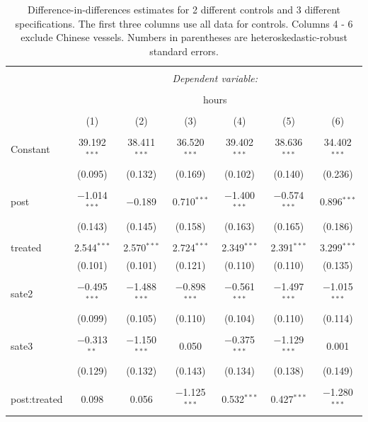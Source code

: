 \documentclass[11pt,english]{article}
\begin{document}
\begin{table}[!htbp] \centering 
  \caption{\label{tab:long}Difference-in-differences estimates for 2 different controls and 3 different specifications. The first three columns use all data for controls. Columns 4 - 6 exclude Chinese vessels. Numbers in parentheses are heteroskedastic-robust standard errors.} 
  \label{} 
\small 
\begin{tabular}{@{\extracolsep{1pt}}lcccccc} 
\\[-1.8ex]\hline 
\hline \\[-1.8ex] 
 & \multicolumn{6}{c}{\textit{Dependent variable:}} \\ 
\cline{2-7} 
\\[-1.8ex] & \multicolumn{6}{c}{hours} \\ 
\\[-1.8ex] & (1) & (2) & (3) & (4) & (5) & (6)\\ 
\hline \\[-1.8ex] 
 Constant & 39.192$^{***}$ & 38.411$^{***}$ & 36.520$^{***}$ & 39.402$^{***}$ & 38.636$^{***}$ & 34.402$^{***}$ \\ 
  & (0.095) & (0.132) & (0.169) & (0.102) & (0.140) & (0.236) \\ 
  & & & & & & \\ 
 post & $-$1.014$^{***}$ & $-$0.189 & 0.710$^{***}$ & $-$1.400$^{***}$ & $-$0.574$^{***}$ & 0.896$^{***}$ \\ 
  & (0.143) & (0.145) & (0.158) & (0.163) & (0.165) & (0.186) \\ 
  & & & & & & \\ 
 treated & 2.544$^{***}$ & 2.570$^{***}$ & 2.724$^{***}$ & 2.349$^{***}$ & 2.391$^{***}$ & 3.299$^{***}$ \\ 
  & (0.101) & (0.101) & (0.121) & (0.110) & (0.110) & (0.135) \\ 
  & & & & & & \\ 
 sate2 & $-$0.495$^{***}$ & $-$1.488$^{***}$ & $-$0.898$^{***}$ & $-$0.561$^{***}$ & $-$1.497$^{***}$ & $-$1.015$^{***}$ \\ 
  & (0.099) & (0.105) & (0.110) & (0.104) & (0.110) & (0.114) \\ 
  & & & & & & \\ 
 sate3 & $-$0.313$^{**}$ & $-$1.150$^{***}$ & 0.050 & $-$0.375$^{***}$ & $-$1.129$^{***}$ & 0.001 \\ 
  & (0.129) & (0.132) & (0.143) & (0.134) & (0.138) & (0.149) \\ 
  & & & & & & \\ 
 post:treated & 0.098 & 0.056 & $-$1.125$^{***}$ & 0.532$^{***}$ & 0.427$^{***}$ & $-$1.280$^{***}$ \\ 

\end{tabular}
\end{table}
\end{document}
